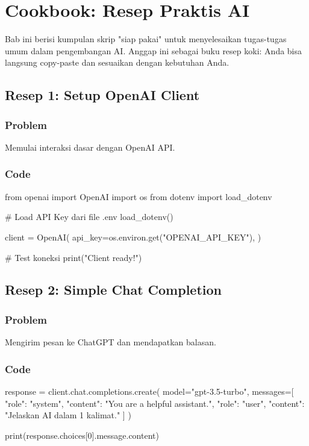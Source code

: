 \chapter{Cookbook: Resep Praktis AI}
\label{chap:cookbook}

Bab ini berisi kumpulan skrip "siap pakai" untuk menyelesaikan tugas-tugas umum dalam pengembangan AI. Anggap ini sebagai buku resep koki: Anda bisa langsung copy-paste dan sesuaikan dengan kebutuhan Anda.

\section{Resep 1: Setup OpenAI Client}

\subsection*{Problem}
Memulai interaksi dasar dengan OpenAI API.

\subsection*{Code}
\begin{codeblock}[language=Python]
from openai import OpenAI
import os
from dotenv import load_dotenv

# Load API Key dari file .env
load_dotenv()

client = OpenAI(
    api_key=os.environ.get("OPENAI_API_KEY"),
)

# Test koneksi
print("Client ready!")
\end{codeblock}

\section{Resep 2: Simple Chat Completion}

\subsection*{Problem}
Mengirim pesan ke ChatGPT dan mendapatkan balasan.

\subsection*{Code}
\begin{codeblock}[language=Python]
response = client.chat.completions.create(
  model="gpt-3.5-turbo",
  messages=[
    {"role": "system", "content": "You are a helpful assistant."},
    {"role": "user", "content": "Jelaskan AI dalam 1 kalimat."}
  ]
)

print(response.choices[0].message.content)
\end{codeblock}


